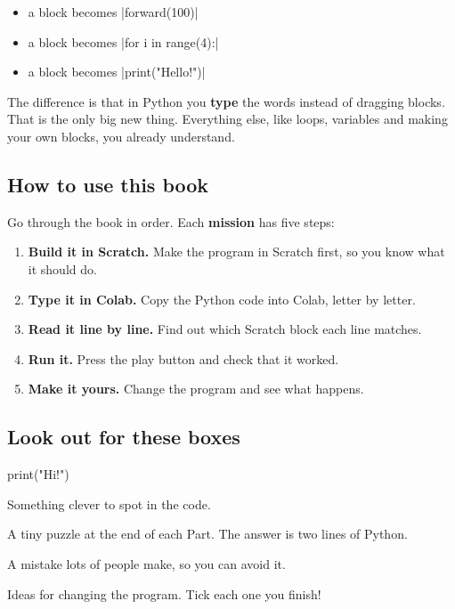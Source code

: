 \begin{itemize}
  \item a  block becomes \py|forward(100)|
  \item a  block becomes \py|for i in range(4):|
  \item a  block becomes \py|print("Hello!")|
\end{itemize}

The difference is that in Python you \textbf{type} the words instead of dragging blocks. That is the only big new thing. Everything else, like loops, variables and making your own blocks, you already understand.

\subsection*{How to use this book}

Go through the book in order. Each \textbf{mission} has five steps:

\begin{enumerate}[label=\textbf{\arabic*.}]
  \item \textbf{Build it in Scratch.} Make the program in Scratch first, so you know what it should do.
  \item \textbf{Type it in Colab.} Copy the Python code into Colab, letter by letter.
  \item \textbf{Read it line by line.} Find out which Scratch block each line matches.
  \item \textbf{Run it.} Press the play button and check that it worked.
  \item \textbf{Make it yours.} Change the program and see what happens.
\end{enumerate}

\subsection*{Look out for these boxes}

\noindent
\begin{minipage}[t]{0.485\linewidth}\vspace{0pt}
\begin{typethis}
print("Hi!")
\end{typethis}
\begin{think}
Something clever to spot in the code.
\end{think}
\begin{puzzle}
A tiny puzzle at the end of each Part. The answer is two lines of Python.
\end{puzzle}
\end{minipage}\hfill
\begin{minipage}[t]{0.485\linewidth}\vspace{0pt}
\begin{watchout}
A mistake lots of people make, so you can avoid it.
\end{watchout}
\begin{challenge}
Ideas for changing the program. Tick each one you finish!
\end{challenge}
\end{minipage}

